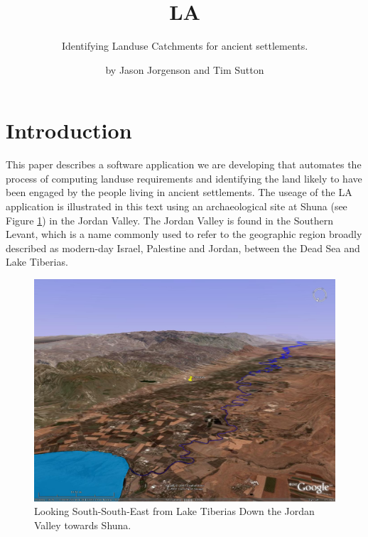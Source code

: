 

\title{LA} \subtitle{Identifying Landuse Catchments for 
ancient settlements.}

\author{by Jason Jorgenson and Tim Sutton}

\maketitle

\section{Introduction} \label{sec:Introduction}
  This paper describes a software application we are developing that automates
  the process of computing landuse requirements and identifying the land likely 
  to have been engaged by the people living in ancient settlements.
  The useage of the LA application is illustrated in this text using an
  archaeological site at Shuna (see Figure \ref{fig:shunaGoogleEarth}) in the
  Jordan Valley.  The Jordan Valley is found in the Southern Levant, which is a name
  commonly used to refer to the geographic region broadly described as
  modern-day Israel, Palestine and Jordan, between the Dead Sea and Lake Tiberias.

\begin{figure}[htbp] %
  \includegraphics[scale=0.17]{./images/ShunaGoogleEarth3D.jpg}
  \caption{\label{fig:shunaGoogleEarth}Looking South-South-East from Lake
    Tiberias Down the Jordan Valley towards Shuna.} 
\end{figure}

